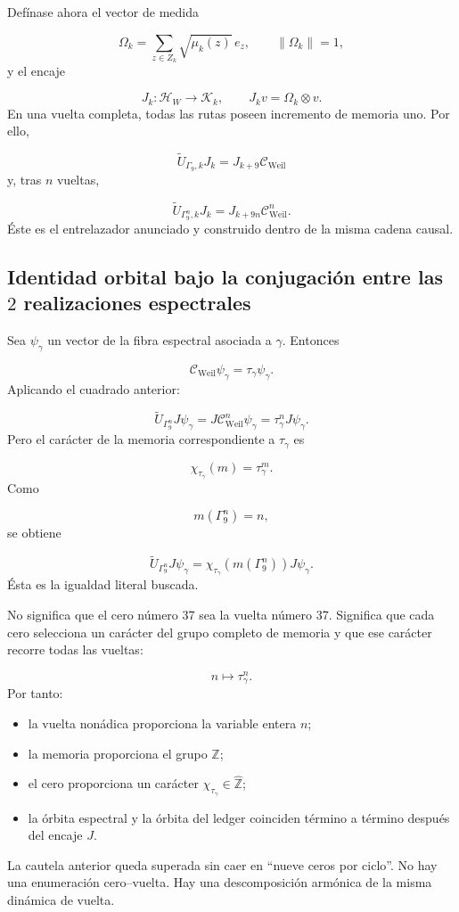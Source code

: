 Defínase ahora el vector de medida\par
\[
\Omega_k
=
\sum_{z\in Z_k}
\sqrt{\mu_k(z)}\,e_z,
\qquad
\|\Omega_k\|=1,
\]
y el encaje\par
\[
J_k:\mathcal H_W\longrightarrow\mathscr K_k,
\qquad
J_kv=\Omega_k\otimes v.
\]
En una vuelta completa, todas las rutas poseen incremento de memoria uno. Por ello,\par
\[
\boxed{
\widetilde U_{\Gamma_9,k}J_k
=
J_{k+9}\mathcal C_{\mathrm{Weil}}
}
\]
y, tras \(n\) vueltas,\par
\[
\boxed{
\widetilde U_{\Gamma_9^n,k}J_k
=
J_{k+9n}\mathcal C_{\mathrm{Weil}}^n.
}
\]
Éste es el entrelazador anunciado y construido dentro de la misma cadena causal.\par
{}
\subsection{Identidad orbital bajo la conjugación entre las \(2\) realizaciones espectrales}
Sea \(\psi_\gamma\) un vector de la fibra espectral asociada a \(\gamma\). Entonces\par
\[
\mathcal C_{\mathrm{Weil}}\psi_\gamma
=
\tau_\gamma\psi_\gamma.
\]
Aplicando el cuadrado anterior:\par
\[
\widetilde U_{\Gamma_9^n}J\psi_\gamma
=
J\mathcal C_{\mathrm{Weil}}^n\psi_\gamma
=
\tau_\gamma^nJ\psi_\gamma.
\]
Pero el carácter de la memoria correspondiente a \(\tau_\gamma\) es\par
\[
\chi_{\tau_\gamma}(m)
=
\tau_\gamma^m.
\]
Como\par
\[
m(\Gamma_9^n)=n,
\]
se obtiene\par
\[
\boxed{
\widetilde U_{\Gamma_9^n}J\psi_\gamma
=
\chi_{\tau_\gamma}
\!\left(m(\Gamma_9^n)\right)
J\psi_\gamma.
}
\]
Ésta es la igualdad literal buscada.\par
No significa que el cero número 37 sea la vuelta número 37. Significa que cada cero selecciona un carácter del grupo completo de memoria y que ese carácter recorre todas las vueltas:\par
\[
n\longmapsto\tau_\gamma^n.
\]
Por tanto:\par
\begin{itemize}
\item la vuelta nonádica proporciona la variable entera \(n\);
\item la memoria proporciona el grupo \(\mathbb Z\);
\item el cero proporciona un carácter \(\chi_{\tau_\gamma}\in\widehat{\mathbb Z}\);
\item la órbita espectral y la órbita del ledger coinciden término a término después del encaje \(J\).
\end{itemize}
La cautela anterior queda superada sin caer en “nueve ceros por ciclo”. No hay una enumeración cero–vuelta. Hay una descomposición armónica de la misma dinámica de vuelta.\par
{}
